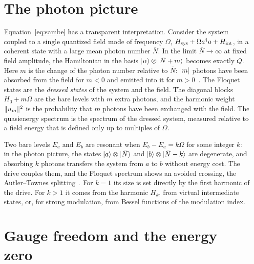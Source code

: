 \section{The photon picture}\label{sec:photons}

Equation~\eqref{eq:sambe} has a transparent interpretation. Consider the system coupled to
a single quantized field mode of frequency $\Omega$, $H_{\mathrm{sys}}+\Omega a^\dagger
a+H_{\mathrm{int}}$, in a coherent state with a large mean photon number $\bar N$. In the
limit $\bar N\to\infty$ at fixed field amplitude, the Hamiltonian in the basis
$\lvert \alpha\rangle\otimes\lvert \bar N+m\rangle$ becomes exactly $Q$. Here $m$ is the change of the photon
number relative to $\bar N$: $\lvert m\rvert$ photons have been absorbed from the field for $m<0$
and emitted into it for
$m>0$~\cite{shirley1965solution,cohentannoudji1977dressed,cohentannoudji1998atom}. The Floquet
states are the \emph{dressed states} of the system and the field. The diagonal blocks
$H_0+m\Omega$ are the bare levels with $m$ extra photons, and the harmonic weight
$\lVert u_m\rVert^2$ is the probability that $m$ photons have been exchanged with the field. The
quasienergy spectrum is the spectrum of the dressed system, measured relative to a field
energy that is defined only up to multiples of $\Omega$.

\begin{physics}
Two bare levels $E_a$ and $E_b$ are resonant when $E_b-E_a=k\Omega$ for some integer $k$:
in the photon picture, the states $\lvert a\rangle\otimes\lvert \bar N\rangle$ and $\lvert b\rangle\otimes\lvert \bar
N-k\rangle$ are degenerate, and absorbing $k$ photons transfers the system from $a$ to $b$ without
energy cost. The drive couples them, and the Floquet spectrum shows an avoided crossing, the
Autler--Townes splitting~\cite{autler1955stark}. For $k=1$ its size is set directly by the
first harmonic of the drive. For $k>1$ it comes from the harmonic $H_k$, from virtual
intermediate states, or, for strong modulation, from Bessel functions of the modulation
index.
\end{physics}

\section{Gauge freedom and the energy zero}\label{sec:gauge}

